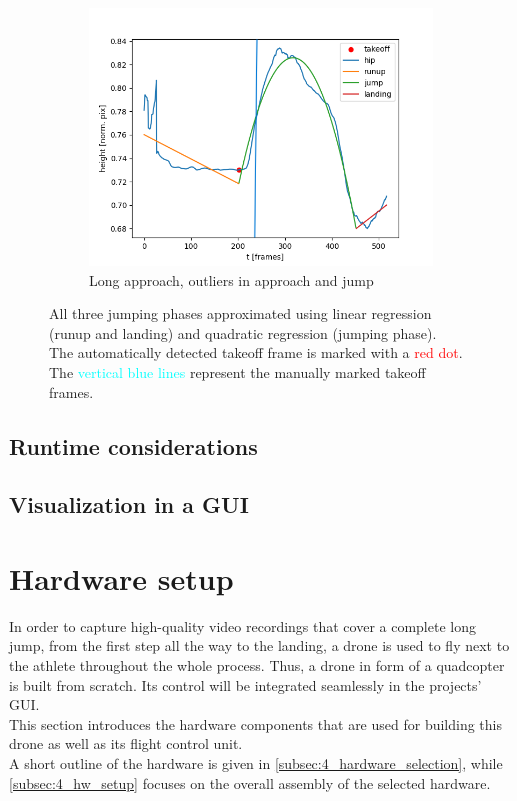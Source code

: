 \begin{figure}[h!]
\begin{subfigure}{0.45\textwidth}
        \includegraphics[width=\textwidth]{regression_poor_approach_jump.png}
        \caption{Long approach, outliers in approach and jump}
    \end{subfigure}
    \caption[Automatic takeoff frame detection results]{
        All three jumping phases approximated using linear regression
        (runup and landing) and quadratic regression (jumping phase).\\
        The automatically detected takeoff frame is marked with a
        \textcolor{red}{red dot}.\\
        The \textcolor{cyan}{vertical blue lines} represent the manually marked
        takeoff frames.}
\label{fig:4_automatic_takeoff_results}
\end{figure}
\FloatBarrier

\subsection{Runtime considerations}\label{subsec:4_runtime_performance}

\subsection{Visualization in a \acs*{GUI}}\label{subsec:4_lj_software_gui}

\section{Hardware setup}\label{sec:4_hardware}
In order to capture high-quality video recordings that cover a complete long 
jump, from the first step all the way to the landing, a drone is used to fly
next to the athlete throughout the whole process.
Thus, a drone in form of a quadcopter is built from scratch.
Its control will be integrated seamlessly in the projects' \ac{GUI}.\\
This section introduces the hardware components that are used for building 
this drone as well as its flight control unit.\\
A short outline of the hardware is given in 
\autoref{subsec:4_hardware_selection},
while \autoref{subsec:4_hw_setup} focuses on the overall assembly of the 
selected hardware.

